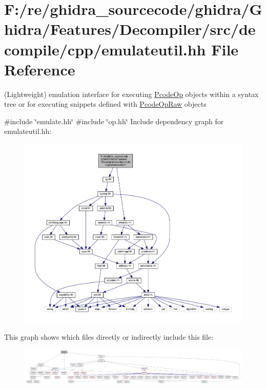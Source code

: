 \hypertarget{emulateutil_8hh}{}\section{F\+:/re/ghidra\+\_\+sourcecode/ghidra/\+Ghidra/\+Features/\+Decompiler/src/decompile/cpp/emulateutil.hh File Reference}
\label{emulateutil_8hh}


(Lightweight) emulation interface for executing \mbox{\hyperlink{class_pcode_op}{Pcode\+Op}} objects within a syntax tree or for executing snippets defined with \mbox{\hyperlink{class_pcode_op_raw}{Pcode\+Op\+Raw}} objects  


{\ttfamily \#include \char`\"{}emulate.\+hh\char`\"{}}\newline
{\ttfamily \#include \char`\"{}op.\+hh\char`\"{}}\newline
Include dependency graph for emulateutil.\+hh\+:
\nopagebreak
\begin{figure}[H]
\begin{center}
\leavevmode
\includegraphics[width=350pt]{emulateutil_8hh__incl}
\end{center}
\end{figure}
This graph shows which files directly or indirectly include this file\+:
\nopagebreak
\begin{figure}[H]
\begin{center}
\leavevmode
\includegraphics[width=350pt]{emulateutil_8hh__dep__incl}
\end{center}
\end{figure}

